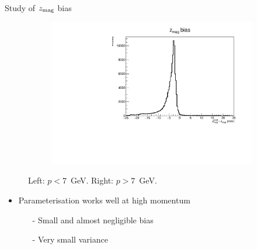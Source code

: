 \documentclass[xcolor={dvipsnames}]{beamer}
\begin{document}
\begin{frame}{Study of $z_{\rm mag}$ bias}
\begin{figure}[htb]
\begin{subfigure}{0.50\textwidth}
      \includegraphics[width=1\textwidth]{Plots/z_mag_position_bias_old_parameterisation_high_p.pdf}
    \end{subfigure}
    \vspace{-0.2cm}
    \caption*{Left: $p < 7$~GeV. Right: $p > 7$~GeV.}
  \end{figure}
  \vspace{-0.5cm}
  \begin{itemize}
    \item{Parameterisation works well at high momentum}
    \begin{itemize}
      \item[-]{Small and almost negligible bias}
      \item[-]{Very small variance}
    \end{itemize}
  \end{itemize}
\end{frame}
\end{document}
